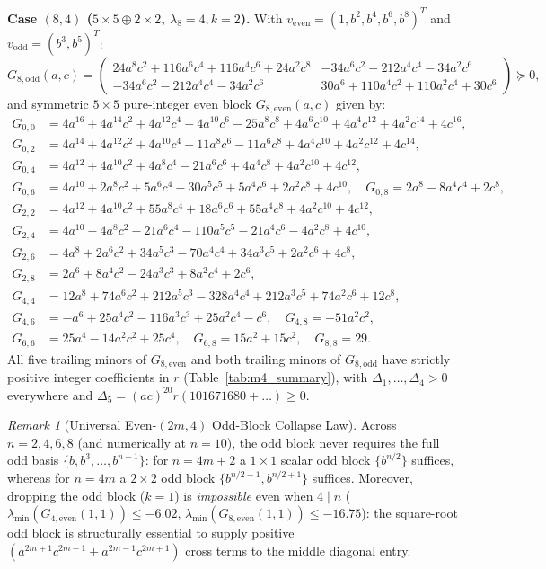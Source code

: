 \documentclass[11pt,a4paper]{article}
\theoremstyle{remark}
\newtheorem{remark}[theorem]{Remark}
\begin{document}
\textbf{Case $(8,4)$ ($5\times 5\oplus 2\times 2$, $\lambda_8=4, k=2$).} With $v_{\mathrm{even}}=(1,b^2,b^4,b^6,b^8)^T$ and $v_{\mathrm{odd}}=(b^3,b^5)^T$:
\[
G_{8,\mathrm{odd}}(a,c) = \begin{pmatrix}
24a^8c^2 + 116a^6c^4 + 116a^4c^6 + 24a^2c^8 & -34a^6c^2 - 212a^4c^4 - 34a^2c^6 \\
-34a^6c^2 - 212a^4c^4 - 34a^2c^6 & 30a^6 + 110a^4c^2 + 110a^2c^4 + 30c^6
\end{pmatrix} \succeq 0,
\]
and symmetric $5\times 5$ pure-integer even block $G_{8,\mathrm{even}}(a,c)$ given by:
\begin{align*}
  G_{0,0} &= 4a^{16}+4a^{14}c^2+4a^{12}c^4+4a^{10}c^6-25a^8c^8+4a^6c^{10}+4a^4c^{12}+4a^2c^{14}+4c^{16}, \\
  G_{0,2} &= 4a^{14}+4a^{12}c^2+4a^{10}c^4-11a^8c^6-11a^6c^8+4a^4c^{10}+4a^2c^{12}+4c^{14}, \\
  G_{0,4} &= 4a^{12}+4a^{10}c^2+4a^8c^4-21a^6c^6+4a^4c^8+4a^2c^{10}+4c^{12}, \\
  G_{0,6} &= 4a^{10}+2a^8c^2+5a^6c^4-30a^5c^5+5a^4c^6+2a^2c^8+4c^{10}, \quad G_{0,8} = 2a^8-8a^4c^4+2c^8, \\
  G_{2,2} &= 4a^{12}+4a^{10}c^2+55a^8c^4+18a^6c^6+55a^4c^8+4a^2c^{10}+4c^{12}, \\
  G_{2,4} &= 4a^{10}-4a^8c^2-21a^6c^4-110a^5c^5-21a^4c^6-4a^2c^8+4c^{10}, \\
  G_{2,6} &= 4a^8+2a^6c^2+34a^5c^3-70a^4c^4+34a^3c^5+2a^2c^6+4c^8, \\
  G_{2,8} &= 2a^6+8a^4c^2-24a^3c^3+8a^2c^4+2c^6, \\
  G_{4,4} &= 12a^8+74a^6c^2+212a^5c^3-328a^4c^4+212a^3c^5+74a^2c^6+12c^8, \\
  G_{4,6} &= -a^6+25a^4c^2-116a^3c^3+25a^2c^4-c^6, \quad G_{4,8} = -51a^2c^2, \\
  G_{6,6} &= 25a^4-14a^2c^2+25c^4, \quad G_{6,8} = 15a^2+15c^2, \quad G_{8,8} = 29.
\end{align*}
All five trailing minors of $G_{8,\mathrm{even}}$ and both trailing minors of $G_{8,\mathrm{odd}}$ have strictly positive integer coefficients in $r$ (Table~\ref{tab:m4_summary}), with $\Delta_1,\dots,\Delta_4>0$ everywhere and $\Delta_5 = (ac)^{20}r(101671680+\dots)\ge 0$.

\begin{remark}[Universal Even-$(2m,4)$ Odd-Block Collapse Law]
Across $n=2,4,6,8$ (and numerically at $n=10$), the odd block never requires the full odd basis $\{b,b^3,\dots,b^{n-1}\}$: for $n=4m+2$ a $1\times 1$ scalar odd block $\{b^{n/2}\}$ suffices, whereas for $n=4m$ a $2\times 2$ odd block $\{b^{n/2-1},b^{n/2+1}\}$ suffices. Moreover, dropping the odd block ($k=1$) is \emph{impossible} even when $4\mid n$ ($\lambda_{\min}(G_{4,\mathrm{even}}(1,1))\le -6.02$, $\lambda_{\min}(G_{8,\mathrm{even}}(1,1))\le -16.75$): the square-root odd block is structurally essential to supply positive $(a^{2m+1}c^{2m-1}+a^{2m-1}c^{2m+1})$ cross terms to the middle diagonal entry.
\end{remark}
\end{document}
